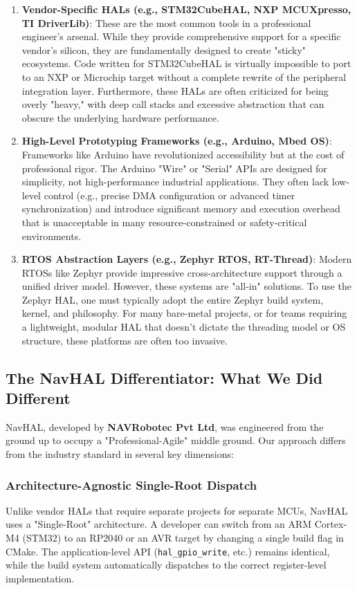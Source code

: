 \begin{enumerate}
    \item \textbf{Vendor-Specific HALs (e.g., STM32CubeHAL, NXP MCUXpresso, TI DriverLib)}:
    These are the most common tools in a professional engineer's arsenal. While they provide comprehensive support for a specific vendor's silicon, they are fundamentally designed to create "sticky" ecosystems. Code written for STM32CubeHAL is virtually impossible to port to an NXP or Microchip target without a complete rewrite of the peripheral integration layer. Furthermore, these HALs are often criticized for being overly "heavy," with deep call stacks and excessive abstraction that can obscure the underlying hardware performance.

    \item \textbf{High-Level Prototyping Frameworks (e.g., Arduino, Mbed OS)}:
    Frameworks like Arduino have revolutionized accessibility but at the cost of professional rigor. The Arduino "Wire" or "Serial" APIs are designed for simplicity, not high-performance industrial applications. They often lack low-level control (e.g., precise DMA configuration or advanced timer synchronization) and introduce significant memory and execution overhead that is unacceptable in many resource-constrained or safety-critical environments.

    \item \textbf{RTOS Abstraction Layers (e.g., Zephyr RTOS, RT-Thread)}:
    Modern RTOSs like Zephyr provide impressive cross-architecture support through a unified driver model. However, these systems are "all-in" solutions. To use the Zephyr HAL, one must typically adopt the entire Zephyr build system, kernel, and philosophy. For many bare-metal projects, or for teams requiring a lightweight, modular HAL that doesn't dictate the threading model or OS structure, these platforms are often too invasive.
\end{enumerate}

\subsection{The NavHAL Differentiator: What We Did Different}
NavHAL, developed by \textbf{NAVRobotec Pvt Ltd}, was engineered from the ground up to occupy a "Professional-Agile" middle ground. Our approach differs from the industry standard in several key dimensions:

\subsubsection{Architecture-Agnostic Single-Root Dispatch}
Unlike vendor HALs that require separate projects for separate MCUs, NavHAL uses a "Single-Root" architecture. A developer can switch from an ARM Cortex-M4 (STM32) to an RP2040 or an AVR target by changing a single build flag in CMake. The application-level API (\texttt{hal\_gpio\_write}, etc.) remains identical, while the build system automatically dispatches to the correct register-level implementation.

